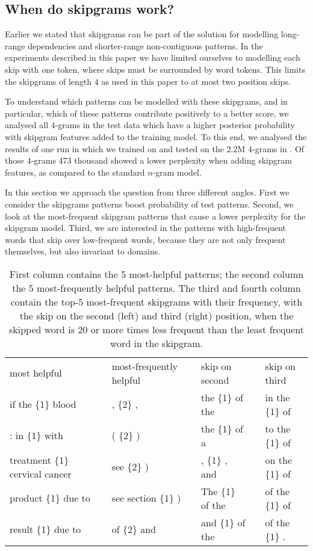 \subsection{When do skipgrams work?}
Earlier we stated that skipgrams can be part of the solution for modelling long-range dependencies and shorter-range non-contiguous patterns. In the experiments described in this paper we have limited ourselves to modelling each skip with one token, where skips must be surrounded by word tokens. This limits the skipgrams of length $4$ as used in this paper to at most two position skips.

To understand which patterns can be modelled with these skipgrams, and in particular, which of these patterns contribute positively to a better score, we analysed all $4$-grams in the test data which have a higher posterior probability with skipgram features added to the training model. 
%
To this end, we analysed the results of one run in which we trained on \obw and tested on the 2.2M $4$-grams in \emea. Of those $4$-grams 473 thousand showed a lower perplexity when adding skipgram features, as compared to the standard $n$-gram model. 

In this section we approach the question from three different angles. First we consider the skipgrams patterns boost probability of test patterns. Second, we look at the most-frequent skipgram patterns that cause a lower perplexity for the skipgram model. Third, we are interested in the patterns with high-frequent words that skip over low-frequent words, because they are not only frequent themselves, but also invariant to domains. 


\begin{table*}
	\small
	\begin{tabular}{lllllll}
		most helpful  & & most-frequently helpful & & skip on second & & skip on third \\ \cline{1-1}\cline{3-3}\cline{5-5}\cline{7-7}
		if the \{1\} blood & & , \{2\} , & & the \{1\} of the &  & in the \{1\} of\\
		: in \{1\} with & & ( \{2\} ) & & the \{1\} of a   & & to the \{1\} of\\
		treatment \{1\} cervical cancer   & & see \{2\} ) & & , \{1\} , and    & & on the \{1\} of\\
		product \{1\} due to & & see section \{1\} ) & & The \{1\} of the & & of the \{1\} of\\
		result \{1\} due to & & of \{2\} and & & and \{1\} of the & & of the \{1\} . \\
	\end{tabular}
	\caption{First column contains the 5 most-helpful patterns; the second column the 5 most-frequently helpful patterns. The third and fourth column contain the top-5 most-frequent skipgrams with their frequency, with the skip on the second (left) and third (right) position, when the skipped word is 20 or more times less frequent than the least frequent word in the skipgram.}\label{ta:examples}
\end{table*}


